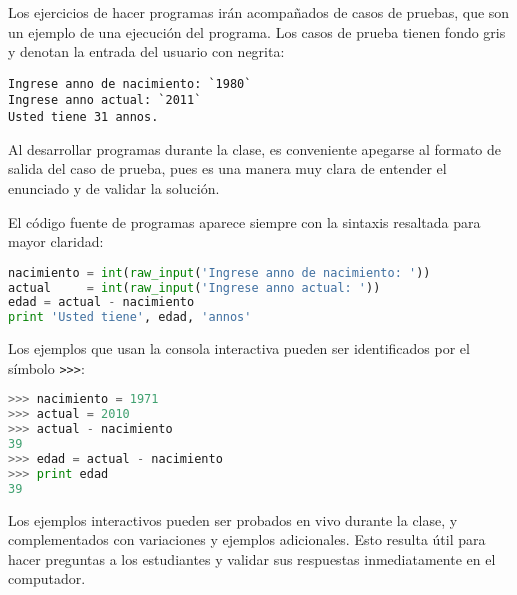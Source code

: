 \documentclass[12pt]{article}
\begin{document}
  Los ejercicios de hacer programas
  irán acompañados de casos de pruebas,
  que son un ejemplo de una ejecución del programa.
  Los casos de prueba tienen fondo gris
  y denotan la entrada del usuario con negrita:%
  \begin{lstlisting}[language=testcase,linewidth=.6\textwidth]
Ingrese anno de nacimiento: `1980`
Ingrese anno actual: `2011`
Usted tiene 31 annos.
  \end{lstlisting}

  Al desarrollar programas durante la clase,
  es conveniente apegarse al formato de salida del caso de prueba,
  pues es una manera muy clara de entender el enunciado
  y de validar la solución.

  El código fuente de programas aparece siempre
  con la sintaxis resaltada para mayor claridad:
  \begin{lstlisting}[language=py,linewidth=.5\textwidth]
nacimiento = int(raw_input('Ingrese anno de nacimiento: '))
actual     = int(raw_input('Ingrese anno actual: '))
edad = actual - nacimiento
print 'Usted tiene', edad, 'annos'
  \end{lstlisting}

  Los ejemplos que usan la consola interactiva
  pueden ser identificados por el símbolo \verb!>>>!:
  \begin{lstlisting}[language=py,linewidth=.5\textwidth]
>>> nacimiento = 1971
>>> actual = 2010
>>> actual - nacimiento
39
>>> edad = actual - nacimiento
>>> print edad
39
  \end{lstlisting}

  Los ejemplos interactivos pueden ser probados
  en vivo durante la clase,
  y complementados con variaciones y ejemplos adicionales.
  Esto resulta útil para hacer preguntas a los estudiantes
  y validar sus respuestas inmediatamente en el computador.
\end{document}
